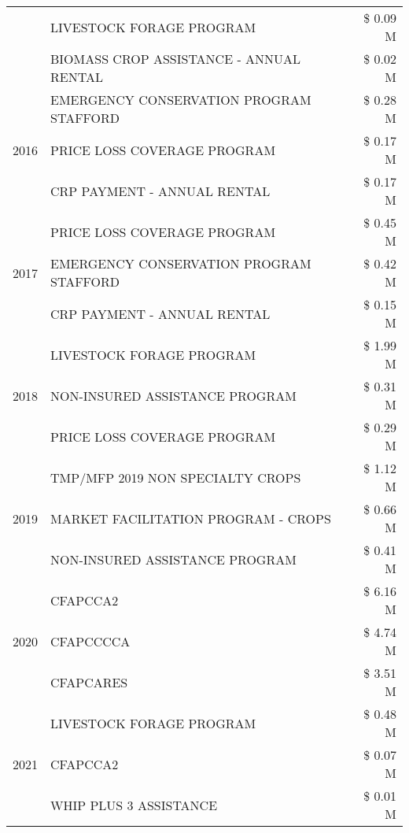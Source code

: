 \begin{tabular}{llr}
 & LIVESTOCK FORAGE PROGRAM & \$ 0.09 M \\
 & BIOMASS CROP ASSISTANCE - ANNUAL RENTAL & \$ 0.02 M \\
\cline{1-3}
\multirow[t]{3}{*}{2016} & EMERGENCY CONSERVATION PROGRAM STAFFORD & \$ 0.28 M \\
 & PRICE LOSS COVERAGE PROGRAM & \$ 0.17 M \\
 & CRP PAYMENT - ANNUAL RENTAL & \$ 0.17 M \\
\cline{1-3}
\multirow[t]{3}{*}{2017} & PRICE LOSS COVERAGE PROGRAM & \$ 0.45 M \\
 & EMERGENCY CONSERVATION PROGRAM STAFFORD & \$ 0.42 M \\
 & CRP PAYMENT - ANNUAL RENTAL & \$ 0.15 M \\
\cline{1-3}
\multirow[t]{3}{*}{2018} & LIVESTOCK FORAGE PROGRAM & \$ 1.99 M \\
 & NON-INSURED ASSISTANCE PROGRAM & \$ 0.31 M \\
 & PRICE LOSS COVERAGE PROGRAM & \$ 0.29 M \\
\cline{1-3}
\multirow[t]{3}{*}{2019} & TMP/MFP 2019 NON SPECIALTY CROPS & \$ 1.12 M \\
 & MARKET FACILITATION PROGRAM - CROPS & \$ 0.66 M \\
 & NON-INSURED ASSISTANCE PROGRAM & \$ 0.41 M \\
\cline{1-3}
\multirow[t]{3}{*}{2020} & CFAPCCA2 & \$ 6.16 M \\
 & CFAPCCCCA & \$ 4.74 M \\
 & CFAPCARES & \$ 3.51 M \\
\cline{1-3}
\multirow[t]{3}{*}{2021} & LIVESTOCK FORAGE PROGRAM & \$ 0.48 M \\
 & CFAPCCA2 & \$ 0.07 M \\
 & WHIP PLUS 3 ASSISTANCE & \$ 0.01 M \\
\cline{1-3}
\bottomrule
\end{tabular}
